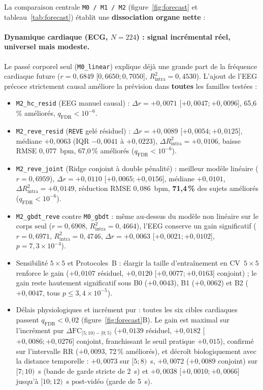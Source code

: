 \documentclass[10pt]{article}
\begin{document}
La comparaison centrale \texttt{M0 / M1 / M2} (figure~\ref{fig:forecast} et tableau~\ref{tab:forecast}) établit une \textbf{dissociation organe nette} :

\paragraph{Dynamique cardiaque (ECG, $N = 224$) : signal incrémental réel, universel mais modeste.}
Le passé corporel seul (\texttt{M0\_linear}) explique déjà une grande part de la fréquence cardiaque future ($r = 0{,}6849$ [$0{,}6650 ; 0{,}7050$], $R^2_{\text{intra}} = 0{,}4530$). L'ajout de l'EEG précoce strictement causal améliore la prévision dans \textbf{toutes} les familles testées :
\begin{itemize}
\item \texttt{M2\_hc\_resid} (EEG manuel causal) : $\Delta r = +0{,}0071$ [$+0{,}0047 ; +0{,}0096$], 65,6\,\% améliorés, $q_{\text{FDR}} < 10^{-6}$.
\item \texttt{M2\_reve\_resid} (\texttt{REVE} gelé résiduel) : $\Delta r = +0{,}0089$ [$+0{,}0054 ; +0{,}0125$], médiane $+0{,}0063$ (IQR $-0{,}0041$ à $+0{,}0223$), $\Delta R^2_{\text{intra}} = +0{,}0106$, baisse RMSE $0{,}077$~bpm, 67,0\,\% améliorés ($q_{\text{FDR}} < 10^{-6}$).
\item \texttt{M2\_reve\_joint} (Ridge conjoint à double pénalité) : meilleur modèle linéaire ($r = 0{,}6959$), $\Delta r = +0{,}0110$ [$+0{,}0065 ; +0{,}0156$], médiane $+0{,}0101$, $\Delta R^2_{\text{intra}} = +0{,}0149$, réduction RMSE $0{,}086$~bpm, \textbf{71,4\,\%} des sujets améliorés ($q_{\text{FDR}} < 10^{-6}$).
\item \texttt{M2\_gbdt\_reve} contre \texttt{M0\_gbdt} : même au-dessus du modèle non linéaire sur le corps seul ($r = 0{,}6908$, $R^2_{\text{intra}} = 0{,}4664$), l'EEG conserve un gain significatif ($r = 0{,}6971$, $R^2_{\text{intra}} = 0{,}4746$, $\Delta r = +0{,}0063$ [$+0{,}0021 ; +0{,}0102$], $p = 7{,}3 \times 10^{-4}$).
\item Sensibilité $5\times 5$ et Protocoles~B : élargir la taille d'entraînement en CV~$5\times 5$ renforce le gain ($+0{,}0107$ résiduel, $+0{,}0120$ [$+0{,}0077 ; +0{,}0163$] conjoint) ; le gain reste hautement significatif sous B0 ($+0{,}0043$), B1 ($+0{,}0062$) et B2 ($+0{,}0047$, tous $p \le 3{,}4 \times 10^{-5}$).
\item Délais physiologiques et incrément pur : toutes les six cibles cardiaques passent $q_{\text{FDR}} < 0{,}02$ (figure~\ref{fig:forecast}B). Le gain est maximal sur l'incrément pur $\Delta\mathrm{FC}_{[5;10)-[0;5)}$ ($+0{,}0139$ résiduel, \textbf{$+0{,}0182$} [$+0{,}0086 ; +0{,}0276$] conjoint, franchissant le seuil pratique $+0{,}015$), confirmé sur l'intervalle RR ($+0{,}0093$, 72\,\% améliorés), et décroît biologiquement avec la distance temporelle : $+0{,}0073$ sur $[5 ; 8)$~s, $+0{,}0072$ ($+0{,}0089$ conjoint) sur $[7 ; 10)$~s (bande de garde stricte de 2~s) et $+0{,}0038$ [$+0{,}0010 ; +0{,}0066$] jusqu'à $[10 ; 12)$~s post-vidéo (garde de 5~s).
\end{itemize}
\end{document}
